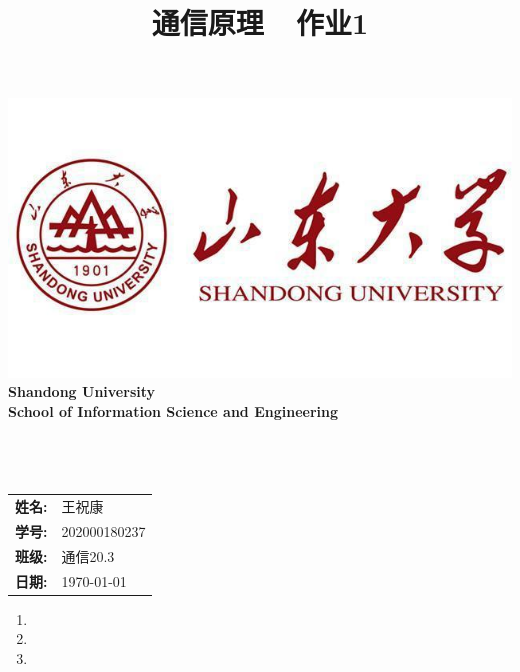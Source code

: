 



\title{通信原理\ \ 作业1}
\cfoot{\thepage}

\begin{titlepage}
  \includegraphics[scale=0.3]{image/logo.jpg}
  \center
  \quad\\[1.5cm]
  \textbf{\Large Shandong University}\\[0.5cm]
  \textbf{\large School of Information Science and Engineering}\\[1.5cm]
  \makeatletter
  \HRule\\[0.4cm]
  {\heiti {} \@title}\\
  \HRule\\[2.5cm]
  \begin{tabular}{ll}
    \textbf{姓名:} & 王祝康       \\
    \textbf{学号:} & 202000180237 \\
    \textbf{班级:} & 通信20.3     \\
    \textbf{日期:} & \today       \\
  \end{tabular}
\end{titlepage}

\begin{enumerate}
  \item 
  \item 
  \item 
\end{enumerate}


